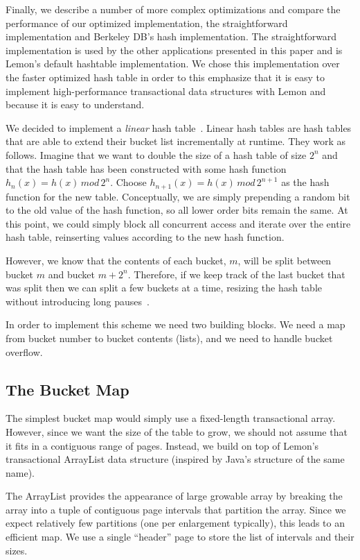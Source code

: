 \documentclass[10pt,letterpaper,twocolumn,english]{article}
\newcommand{\yad}{Lemon\xspace}
\begin{document}
Finally, we describe a number of more complex optimizations and
compare the performance of our optimized implementation, the
straightforward implementation and Berkeley DB's hash implementation.
The straightforward implementation is used by the other applications
presented in this paper and is \yad's default hashtable
implementation.  We chose this implementation over the faster optimized
hash table in order to this emphasize that it is easy to implement
high-performance transactional data structures with \yad and because
it is easy to understand.

We decided to implement a {\em linear} hash table~\cite{lht}.  Linear
hash tables are hash tables that are able to extend their bucket list
incrementally at runtime. They work as follows. Imagine that we want
to double the size of a hash table of size $2^{n}$ and that the hash
table has been constructed with some hash function $h_{n}(x)=h(x)\,
mod\,2^{n}$.  Choose $h_{n+1}(x)=h(x)\, mod\,2^{n+1}$ as the hash
function for the new table. Conceptually, we are simply prepending a
random bit to the old value of the hash function, so all lower order
bits remain the same. At this point, we could simply block all
concurrent access and iterate over the entire hash table, reinserting
values according to the new hash function.

However, 
we know that the contents of each bucket, $m$, will be split between
bucket $m$ and bucket $m+2^{n}$. Therefore, if we keep track of the
last bucket that was split then we can split a few buckets at a time,
resizing the hash table without introducing long pauses~\cite{lht}.

In order to implement this scheme we need two building blocks.  We
need a map from bucket number to bucket contents (lists), and we need to handle bucket overflow.


\subsection{The Bucket Map}

The simplest bucket map would simply use a fixed-length transactional
array. However, since we want the size of the table to grow, we should
not assume that it fits in a contiguous range of pages. Instead, we build
on top of \yad's transactional ArrayList data structure (inspired by
Java's structure of the same name).

The ArrayList provides the appearance of large growable array by
breaking the array into a tuple of contiguous page intervals that
partition the array.  Since we expect relatively few partitions (one
per enlargement typically), this leads to an efficient map. We use a
single ``header'' page to store the list of intervals and their sizes.
\end{document}
